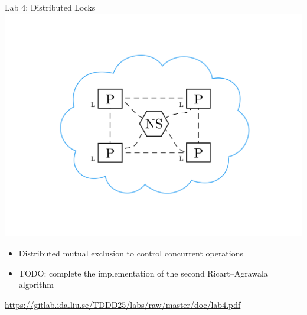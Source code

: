 \documentclass[compress,xcolor=table]{beamer}
\begin{document}
\begin{frame}{Lab 4: Distributed Locks}
  \centering
  \includegraphics[scale=0.10,page=1]{include/assets/lock}
  \begin{itemize}
    \item Distributed mutual exclusion to control concurrent operations
    \item \alert{TODO}: complete the implementation of the second
    Ricart--Agrawala algorithm
  \end{itemize}
  \begin{center}
    \scriptsize \url{https://gitlab.ida.liu.se/TDDD25/labs/raw/master/doc/lab4.pdf}
  \end{center}
\end{frame}
\end{document}
